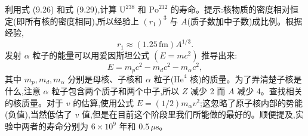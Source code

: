 \begin{question}
利用式 (9.26) 和式 (9.29),计算 $\mathrm U^{238}$ 和 $\mathrm{Po}^{212}$ 的寿命。提示:核物质的密度相对恒定(即所有核的密度相同),所以经验上 $(r_1)^3$ 与 $A$(质子数加中子数)成比例。根据经验,
\[
r_1\approx (1.25\,\mathrm{fm})A^{1/3}.
\]
发射 $\alpha$ 粒子的能量可以用爱因斯坦公式 $(E=mc^2)$ 推导出来:
\[
E=m_pc^2-m_dc^2-m_\alpha c^2,
\]
其中 $m_p,m_d,m_\alpha$ 分别是母核、子核和 $\alpha$ 粒子($\mathrm{He}^4$ 核)的质量。为了弄清楚子核是什么,注意 $\alpha$ 粒子包含两个质子和两个中子,所以 $Z$ 减少 2 而 $A$ 减少 4。查找相关的核质量。对于 $v$ 的估算,使用公式 $E=(1/2)m_\alpha v^2$;这忽略了原子核内部的势能(负值),当然低估了 $v$ 值,但是在目前这个阶段里我们所能做的最好的。顺便提及,实验中两者的寿命分别为 $6\times10^9$ 年和 $0.5\,\mu\mathrm{s}$。

\par\smallskip
{}

\end{question}
